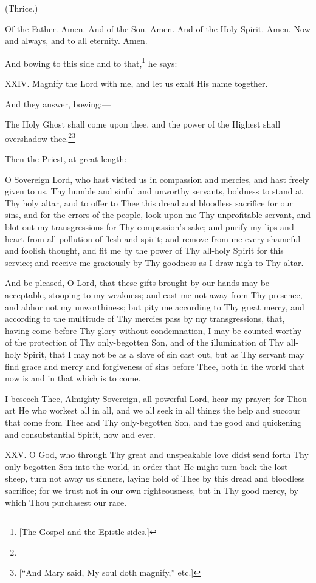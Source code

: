 (Thrice.)

Of the Father. Amen. And of the Son. Amen. And of the Holy Spirit. Amen. Now and always, and to all eternity. Amen.

And bowing to this side and to that,\footnote{\par{}  [The Gospel and the Epistle sides.]} he says:

XXIV. Magnify the Lord with me, and let us exalt His name together.

And they answer, bowing:—

The Holy Ghost shall come upon thee, and the power of the Highest shall overshadow thee.\footnote{}\footnote{\par{}  [“And Mary said, My soul doth magnify,” etc.]}

Then the Priest, at great length:—

O Sovereign Lord, who hast visited us in compassion and mercies, and hast freely given to us, Thy humble and sinful and unworthy servants, boldness to stand at Thy holy altar, and to offer to Thee this dread and bloodless sacrifice for our sins, and for the errors of the people, look upon me Thy unprofitable servant, and blot out my transgressions for Thy compassion’s sake; and purify my lips and heart from all pollution of flesh and spirit; and remove from me every shameful and foolish thought, and fit me by the power of Thy all-holy Spirit for this service; and receive me graciously by Thy goodness as I draw nigh to Thy altar.

And be pleased, O Lord, that these gifts brought by our hands may be acceptable, stooping to my weakness; and cast me not away from Thy presence, and abhor not my unworthiness; but pity me according to Thy great mercy, and according to the multitude of Thy mercies pass by my transgressions, that, having come before Thy glory without condemnation, I may be counted worthy of the protection of Thy only-begotten Son, and of the illumination of Thy all-holy Spirit, that I may not be as a slave of sin cast out, but as Thy servant may find grace and mercy and forgiveness of sins before Thee, both in the world that now is and in that which is to come.

I beseech Thee, Almighty Sovereign, all-powerful Lord, hear my prayer; for Thou art He who workest all in all, and we all seek in all things the help and succour that come from Thee and Thy only-begotten Son, and the good and quickening and consubstantial Spirit, now and ever.

XXV. O God, who through Thy great and unspeakable love didst send forth Thy only-begotten Son into the world, in order that He might turn back the lost sheep, turn not away us sinners, laying hold of Thee by this dread and bloodless sacrifice; for we trust not in our own righteousness, but in Thy good mercy, by which Thou purchasest our race.

